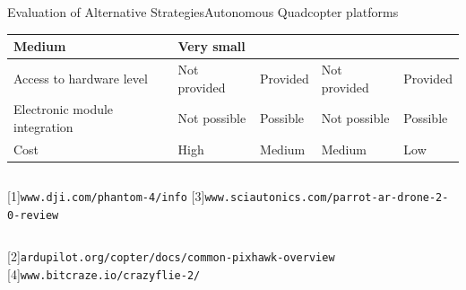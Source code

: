 \documentclass[xcolor=table]{beamer}
\begin{document}
\begin{frame}{Evaluation of Alternative Strategies}{Autonomous Quadcopter platforms}
\begin{footnotesize}
\begin{center}
\begin{tabular}{ |p{2cm}|p{2cm}|p{2cm}|p{2cm}|s| }
Medium & Very small \\
  \hline
  Access to hardware level & Not provided & Provided & Not provided & Provided \\
  \hline
  Electronic module integration & Not possible & Possible & Not possible & Possible \\
  \hline
  Cost & High & Medium & Medium & Low \\
  \hline
  \end{tabular}
  \end{center}
  \end{footnotesize}
  
  \begin{tiny}
  \begin{columns}
  [1]\texttt{www.dji.com/phantom-4/info}
  [3]\texttt{www.sciautonics.com/parrot-ar-drone-2-0-review}
  \end{columns}
  \begin{columns}
  [2]\texttt{ardupilot.org/copter/docs/common-pixhawk-overview}
  [4]\texttt{www.bitcraze.io/crazyflie-2/}
  \end{columns}
  \end{tiny}  
    
\end{frame}
\end{document}
